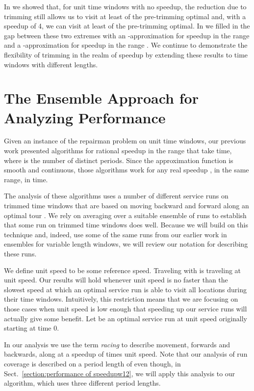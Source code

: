 \documentclass[11pt]{article}
\begin{document}
In \cite{Frederickson6} we showed that, for unit time windows with no speedup, the reduction due to trimming still allows us to visit at least  of the pre-trimming optimal and, with a speedup of 4, we can visit at least  of the pre-trimming optimal.  In \cite{Frederickson5} we filled in the gap between these two extremes with an -approximation for speedup in the range  and a -approximation for speedup in the range .  We continue to demonstrate the flexibility of trimming in the realm of speedup by extending these results to time windows with different lengths.


\section{The Ensemble Approach for Analyzing Performance}
\label{section:ensemble}

Given an instance of the repairman problem on unit time windows, our previous work \cite{Frederickson5} presented algorithms for rational speedup  in the range  that take  time, where  is the number of distinct periods.  Since the approximation function is smooth and continuous, those algorithms work for any real speedup , in the same range, in   time.  

The analysis of these algorithms uses a number of different service runs on trimmed time windows that are based on moving backward and forward along an optimal tour .  We rely on averaging over a suitable ensemble of runs to establish that some run  on trimmed time windows does well.  Because we will build on this technique and, indeed, use some of the same runs from our earlier work \cite{Frederickson5} in ensembles for variable length windows, we will review our notation for describing these runs.

We define unit speed to be some reference speed.  Traveling with  is traveling at unit speed.  Our results will hold whenever unit speed is no faster than the slowest speed at which an optimal service run is able to visit all locations during their time windows.  Intuitively, this restriction means that we are focusing on those cases when unit speed is low enough that speeding up our service runs will actually give some benefit.
Let  be an optimal service run at unit speed originally starting at time 0.

In our analysis
we use the term {\em racing} to describe movement, forwards and backwards, along  at a speedup of  times unit speed.  Note that our analysis of run coverage is described on a period length of  even though, in Sect.~\ref{section:performance of speedupw12}, we will apply this analysis to our algorithm, which uses three different period lengths.
\end{document}
